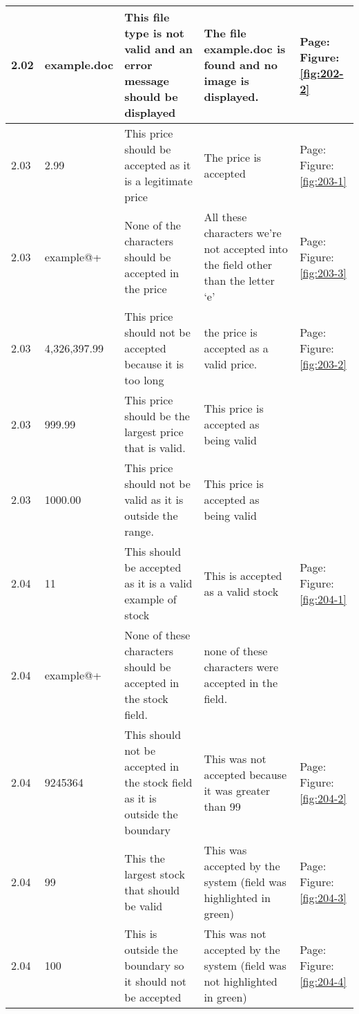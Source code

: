 \begin{flushleft}
\begin{longtable}{|p{1.0cm}|p{2.5cm}|p{3cm}|p{3.0cm}|p{2.5cm}|}
	2.02 & example.doc & This file type is not valid and an error message should be displayed & The file example.doc is found and no image is displayed. & Page:\pageref{fig:202-2}  \newline Figure:\ref{fig:202-2}\\ \hline
	2.03 & 2.99 & This price should be accepted as it is a legitimate price & The price is accepted & Page:\pageref{fig:203-1}  \newline Figure:\ref{fig:203-1}\\ \hline
	2.03 &  example@+ & None of the characters should be accepted in the price & All these characters we're not accepted into the field other than the letter `e' & Page:\pageref{fig:203-3}  \newline Figure:\ref{fig:203-3}\\ \hline
	2.03 & 4,326,397.99 & This price should not be accepted because it is too long& the price is accepted as a valid price. & Page:\pageref{fig:203-2}  \newline Figure:\ref{fig:203-2}\\ \hline
	2.03 & 999.99 & This price should be the largest price that is valid.& This price is accepted as being valid & \\ \hline
	2.03 & 1000.00 & This price should not be valid as it is outside the range.& This price is accepted as being valid & \\ \hline
	2.04 &  11  & This should be accepted as it is a valid example of stock & This is accepted as a valid stock & Page:\pageref{fig:204-1}  \newline Figure:\ref{fig:204-1} \\ \hline
	2.04 &  example@+ & None of these characters should be accepted in the stock field. & none of these characters were accepted in the field.  & \\ \hline
	2.04 &  9245364 & This should not be accepted in the stock field as it is outside the boundary& This was not accepted because it was greater than 99 & Page:\pageref{fig:204-2}  \newline Figure:\ref{fig:204-2} \\ \hline
	2.04 &  99  &This the largest stock that should be valid& This was accepted by the system (field was highlighted in green) & Page:\pageref{fig:204-3}  \newline Figure:\ref{fig:204-3}\\ \hline
	2.04 &  100  & This is outside the boundary so it should not be accepted & This was not accepted by the system (field was not highlighted in green) & Page:\pageref{fig:204-4}  \newline Figure:\ref{fig:204-4} \\ \hline

\end{longtable}
\end{flushleft}
